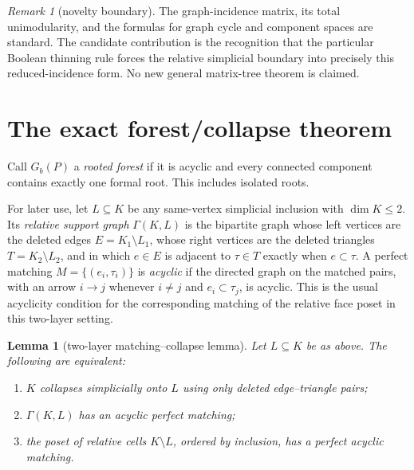 \documentclass[11pt]{article}
\newtheorem{lemma}[theorem]{Lemma}
\theoremstyle{definition}
\theoremstyle{remark}
\newtheorem{remark}[theorem]{Remark}
\begin{document}
\begin{remark}[novelty boundary]
The graph-incidence matrix, its total unimodularity, and the formulas for graph cycle
and component spaces are standard.  The candidate contribution is the recognition
that the particular Boolean thinning rule forces the relative simplicial boundary
into precisely this reduced-incidence form.  No new general matrix-tree theorem is
claimed.
\end{remark}

\section{The exact forest/collapse theorem}\label{sec:forest}

Call $G_b(P)$ a \emph{rooted forest} if it is acyclic and every connected component
contains exactly one formal root.  This includes isolated roots.

For later use, let $L\subseteq K$ be any same-vertex simplicial inclusion with
$\dim K\le2$.  Its \emph{relative support graph} $\Gamma(K,L)$ is the bipartite graph
whose left vertices are the deleted edges $E=K_1\setminus L_1$, whose right vertices
are the deleted triangles $T=K_2\setminus L_2$, and in which $e\in E$ is adjacent to
$\tau\in T$ exactly when $e\subset\tau$.  A perfect matching
$M=\{(e_i,\tau_i)\}$ is \emph{acyclic} if the directed graph on the matched pairs,
with an arrow $i\to j$ whenever $i\ne j$ and $e_i\subset\tau_j$, is acyclic.  This is
the usual acyclicity condition for the corresponding matching of the relative face
poset in this two-layer setting.

\begin{lemma}[two-layer matching--collapse lemma]\label{lem:matching-collapse}
Let $L\subseteq K$ be as above.  The following are equivalent:
\begin{enumerate}[label=(\roman*)]
\item $K$ collapses simplicially onto $L$ using only deleted edge--triangle pairs;
\item $\Gamma(K,L)$ has an acyclic perfect matching;
\item the poset of relative cells $K\setminus L$, ordered by inclusion, has a perfect
acyclic matching.
\end{enumerate}
\end{lemma}
\end{document}
